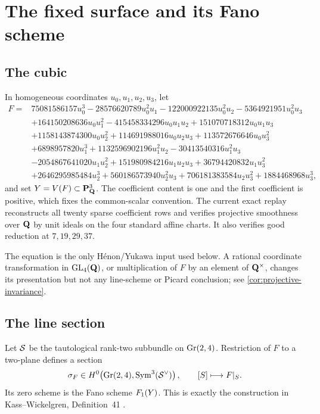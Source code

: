 \section{The fixed surface and its Fano scheme}
\label{sec:surface-fano}

\subsection{The cubic}

In homogeneous coordinates \(u_0,u_1,u_2,u_3\), let
\begin{align}
F={}&75081586157u_0^3-28576620789u_0^2u_1
-122000922135u_0^2u_2-5364921951u_0^2u_3\nonumber\\
&+164150208636u_0u_1^2-415458334296u_0u_1u_2
+151070718312u_0u_1u_3\nonumber\\
&+1158143874300u_0u_2^2+114691988016u_0u_2u_3
+113572676646u_0u_3^2\nonumber\\
&+6898957820u_1^3+1132596902196u_1^2u_2
-30413540316u_1^2u_3\nonumber\\
&-2054867641020u_1u_2^2+151980984216u_1u_2u_3
+36794420832u_1u_3^2\nonumber\\
&+2646295985484u_2^3+560186573940u_2^2u_3
+706181383584u_2u_3^2+1884468968u_3^3,
\label{eq:cubic}
\end{align}
and set \(Y=V(F)\subset\mathbf P^3_{\mathbf Q}\).  The coefficient content is one and the
first coefficient is positive, which fixes the common-scalar convention.
The current exact replay reconstructs all twenty sparse coefficient rows and
verifies projective smoothness over \(\mathbf Q\) by unit ideals on the four
standard affine charts.  It also verifies good reduction at
\(7,19,29,37\).

The equation is the only H\'enon/Yukawa input used below.  A rational
coordinate transformation in \(\operatorname{GL}_4(\mathbf Q)\), or multiplication
of \(F\) by an element of \(\mathbf Q^\times\), changes its presentation but not any
line-scheme or Picard conclusion; see \cref{cor:projective-invariance}.

\subsection{The line section}

Let \(\mathcal S\) be the tautological rank-two subbundle on \(\operatorname{Gr}(2,4)\).
Restriction of \(F\) to a two-plane defines a section
\begin{equation}
  \sigma_F\in H^0\!\left(\operatorname{Gr}(2,4),
             \operatorname{Sym}^3(\mathcal S^\vee)\right),
  \qquad [S]\longmapsto F|_S .
\label{eq:line-section}
\end{equation}
Its zero scheme is the Fano scheme \(F_1(Y)\).  This is exactly the
construction in Kass--Wickelgren, Definition~41
\cite{KassWickelgren2021}.

